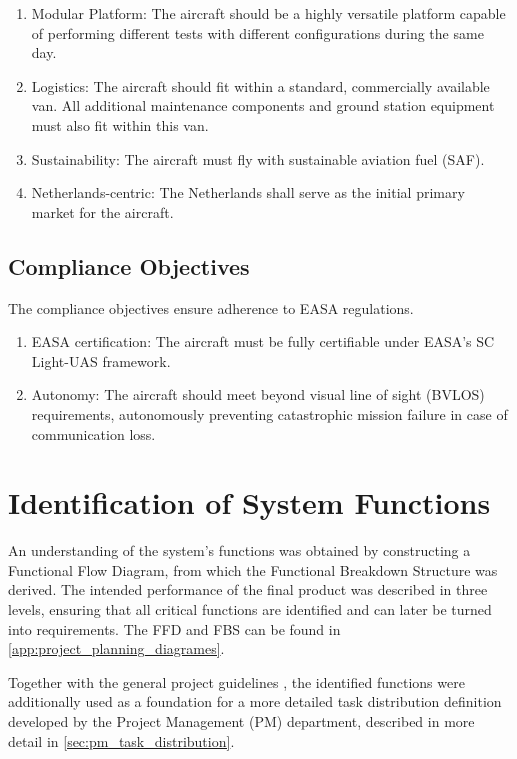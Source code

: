 \begin{enumerate}
    \item Modular Platform: The aircraft should be a highly versatile platform capable of performing different tests with different configurations during the same day. 
    \item Logistics: The aircraft should fit within a standard, commercially available van. All additional maintenance components and ground station equipment must also fit within this van.
    \item Sustainability: The aircraft must fly with sustainable aviation fuel (SAF).
    \item Netherlands-centric: The Netherlands shall serve as the initial primary market for the aircraft.
\end{enumerate}


\subsection{Compliance Objectives}
The compliance objectives ensure adherence to EASA regulations.

\begin{enumerate}
    \item EASA certification: The aircraft must be fully certifiable under EASA's SC Light-UAS framework.
    \item Autonomy: The aircraft should meet beyond visual line of sight (BVLOS) requirements, autonomously preventing catastrophic mission failure in case of communication loss.
\end{enumerate}


\section{Identification of System Functions}
\label{sec:identification_system_functions}
An understanding of the system's functions was obtained by constructing a Functional Flow Diagram, from which the Functional Breakdown Structure was derived. The intended performance of the final product was described in three levels, ensuring that all critical functions are identified and can later be turned into requirements. The FFD and FBS can be found in \autoref{app:project_planning_diagrames}.

Together with the general project guidelines \cite{Castro2026}, the identified functions were additionally used as a foundation for a more detailed task distribution definition developed by the Project Management (PM) department, described in more detail in \autoref{sec:pm_task_distribution}.



